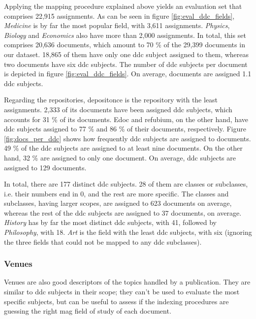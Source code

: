 Applying the mapping procedure explained above yields an evaluation set that comprises 22,915 assignments. As can be seen in figure \ref{fig:eval_ddc_fields}, \textit{Medicine} is by far the most popular field, with 3,611 assignments. \textit{Physics}, \textit{Biology} and \textit{Economics} also have more than 2,000 assignments. In total, this set comprises 20,636 documents, which amount to 70 \% of the 29,399 documents in our dataset. 18,865 of them have only one \acrshort{ddc} subject assigned to them, whereas two documents have six \acrshort{ddc} subjects. The number of \acrshort{ddc} subjects per document is depicted in figure \ref{fig:eval_ddc_fields}. On average, documents are assigned 1.1 \acrshort{ddc} subjects.

Regarding the repositories, depositonce is the repository with the least assignments. 2,333 of its documents have been assigned \acrshort{ddc} subjects, which accounts for 31 \% of its documents. Edoc and refubium, on the other hand, have \acrshort{ddc} subjects assigned to 77 \% and 86 \% of their documents, respectively. Figure \ref{fig:docs_per_ddc} shows how frequently \acrshort{ddc} subjects are assigned to documents. 49 \% of the \acrshort{ddc} subjects are assigned to at least nine documents. On the other hand, 32 \% are assigned to only one document. On average, \acrshort{ddc} subjects are assigned to 129 documents.

In total, there are 177 distinct \acrshort{ddc} subjects. 28 of them are classes or subclasses, i.e. their numbers end in $0$, and the rest are more specific. The classes and subclasses, having larger scopes, are assigned to 623 documents on average, whereas the rest of the \acrshort{ddc} subjects are assigned to 37 documents, on average. \textit{History} has by far the most distinct \acrshort{ddc} subjects, with 41, followed by \textit{Philosophy}, with 18. \textit{Art} is the field with the least \acrshort{ddc} subjects, with six (ignoring the three fields that could not be mapped to any \acrshort{ddc} subclasses).

\subsubsection{Venues} \label{eval_venues}

Venues are also good descriptors of the topics handled by a publication. They are similar to \acrshort{ddc} subjects in their scope; they can't be used to evaluate the most specific subjects, but can be useful to assess if the indexing procedures are guessing the right \acrshort{mag} field of study of each document.

